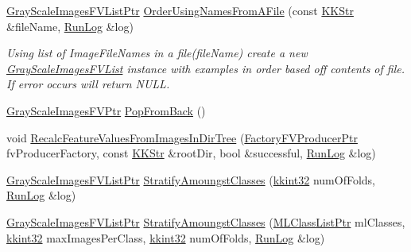 \begin{DoxyCompactItemize}
\hyperlink{class_k_k_m_l_l_1_1_gray_scale_images_f_v_list_adf1c0ec2049ac8cb8689dc30f8f78ac3}{Gray\+Scale\+Images\+F\+V\+List\+Ptr} \hyperlink{class_k_k_m_l_l_1_1_gray_scale_images_f_v_list_a9dda16f9868ecd4a2593c228f60e1e57}{Order\+Using\+Names\+From\+A\+File} (const \hyperlink{class_k_k_b_1_1_k_k_str}{K\+K\+Str} \&file\+Name, \hyperlink{class_k_k_b_1_1_run_log}{Run\+Log} \&log)
\begin{DoxyCompactList}\small\item\em Using list of Image\+File\+Names in a file(\textquotesingle{}file\+Name\textquotesingle{}) create a new \hyperlink{class_k_k_m_l_l_1_1_gray_scale_images_f_v_list}{Gray\+Scale\+Images\+F\+V\+List} instance with examples in order based off contents of file. If error occurs will return N\+U\+LL. \end{DoxyCompactList}\item 
\hyperlink{namespace_k_k_m_l_l_ac3f21d259a7b1893920f27296d70bc6e}{Gray\+Scale\+Images\+F\+V\+Ptr} \hyperlink{class_k_k_m_l_l_1_1_gray_scale_images_f_v_list_a3679526994558f36a28e2e4721733801}{Pop\+From\+Back} ()
\item 
void \hyperlink{class_k_k_m_l_l_1_1_gray_scale_images_f_v_list_a0f39ed6d97e2a08b0ec63daade4fa5e4}{Recalc\+Feature\+Values\+From\+Images\+In\+Dir\+Tree} (\hyperlink{namespace_k_k_m_l_l_a82812d1feb85a6cff72d059bc67bb90e}{Factory\+F\+V\+Producer\+Ptr} fv\+Producer\+Factory, const \hyperlink{class_k_k_b_1_1_k_k_str}{K\+K\+Str} \&root\+Dir, bool \&successful, \hyperlink{class_k_k_b_1_1_run_log}{Run\+Log} \&log)
\item 
\hyperlink{class_k_k_m_l_l_1_1_gray_scale_images_f_v_list_adf1c0ec2049ac8cb8689dc30f8f78ac3}{Gray\+Scale\+Images\+F\+V\+List\+Ptr} \hyperlink{class_k_k_m_l_l_1_1_gray_scale_images_f_v_list_a9139a103eea08762c9a1f4fd1c9ffeb7}{Stratify\+Amoungst\+Classes} (\hyperlink{namespace_k_k_b_a8fa4952cc84fda1de4bec1fbdd8d5b1b}{kkint32} num\+Of\+Folds, \hyperlink{class_k_k_b_1_1_run_log}{Run\+Log} \&log)
\item 
\hyperlink{class_k_k_m_l_l_1_1_gray_scale_images_f_v_list_adf1c0ec2049ac8cb8689dc30f8f78ac3}{Gray\+Scale\+Images\+F\+V\+List\+Ptr} \hyperlink{class_k_k_m_l_l_1_1_gray_scale_images_f_v_list_a5f2af12e2850fde10a4948e57b935feb}{Stratify\+Amoungst\+Classes} (\hyperlink{namespace_k_k_m_l_l_af091cde3f4a4315658b41a5e7583fc26}{M\+L\+Class\+List\+Ptr} ml\+Classes, \hyperlink{namespace_k_k_b_a8fa4952cc84fda1de4bec1fbdd8d5b1b}{kkint32} max\+Images\+Per\+Class, \hyperlink{namespace_k_k_b_a8fa4952cc84fda1de4bec1fbdd8d5b1b}{kkint32} num\+Of\+Folds, \hyperlink{class_k_k_b_1_1_run_log}{Run\+Log} \&log)
\end{DoxyCompactItemize}
